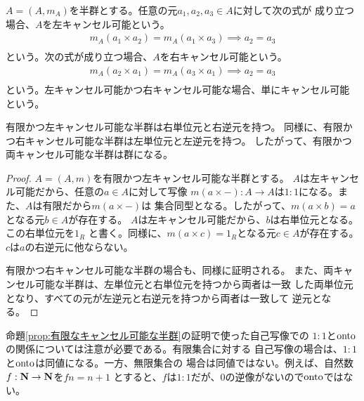 	\begin{definition}\label{def:キャンセル可能} %
		$A=(A,m_A)$を半群とする。任意の元$a_1,a_2,a_3\in A$に対して次の式が
		成り立つ場合、$A$を左キャンセル可能という。
		\begin{equation*}\begin{split} %
			m_A(a_1\times a_2) = m_A(a_1\times a_3) \implies a_2 = a_3 \\
		\end{split}\end{equation*} %
		という。次の式が成り立つ場合、$A$を右キャンセル可能という。
		\begin{equation*}\begin{split} %
			m_A(a_2\times a_1) = m_A(a_3\times a_1) \implies a_2 = a_3 \\
		\end{split}\end{equation*} %
		という。左キャンセル可能かつ右キャンセル可能な場合、単にキャンセル可能
		という。
	\end{definition} %

	\begin{proposition}[有限なキャンセル可能な半群]\label{prop:有限なキャンセル可能な半群} %
		有限かつ左キャンセル可能な半群は右単位元と右逆元を持つ。
		同様に、有限かつ右キャンセル可能な半群は左単位元と左逆元を持つ。
		したがって、有限かつ両キャンセル可能な半群は群になる。
	\end{proposition} %
	\begin{proof} %
		$A=(A,m)$を有限かつ左キャンセル可能な半群とする。
		$A$は左キャンセル可能だから、任意の$a\in A$に対して写像
		$m(a\times-):A\to A$は$1:1$になる。また、$A$は有限だから$m(a\times-)$は
		集合同型となる。したがって、$m(a\times b)=a$となる元$b\in A$が存在する。
		$A$は左キャンセル可能だから、$b$は右単位元となる。この右単位元を$1_R$
		と書く。同様に、$m(a\times c)=1_R$となる元$c\in A$が存在する。
		$c$は$a$の右逆元に他ならない。

		有限かつ右キャンセル可能な半群の場合も、同様に証明される。
		また、両キャンセル可能な半群は、左単位元と右単位元を持つから両者は一致
		した両単位元となり、すべての元が左逆元と右逆元を持つから両者は一致して
		逆元となる。
	\end{proof} %

	命題\ref{prop:有限なキャンセル可能な半群}の証明で使った自己写像での
	$1:1$と$\operatorname{onto}$の関係については注意が必要である。有限集合に対する
	自己写像の場合は、$1:1$と$\operatorname{onto}$は同値になる。一方、無限集合の
	場合は同値ではない。例えば、自然数$f:{\mathbf{N}}\to{\mathbf{N}}$を$fn=n+1$
	とすると、$f$は$1:1$だが、$0$の逆像がないので$\operatorname{onto}$ではない。

